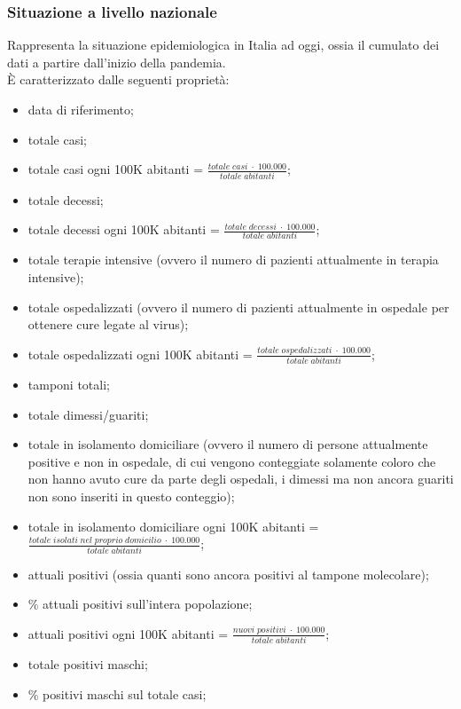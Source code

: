 \subsubsection{Situazione a livello nazionale}
\label{sss:situazione-livello-nazionale}
Rappresenta la situazione epidemiologica in Italia ad oggi, ossia il cumulato dei dati a partire dall'inizio della pandemia.\\
È caratterizzato dalle seguenti proprietà:
\begin{itemize}
    \item data di riferimento;
    \item totale casi;
    \item totale casi ogni 100K abitanti = $\frac{totale \; casi \; \cdot \; 100.000}{totale \; abitanti}$;
    \item totale decessi;
    \item totale decessi ogni 100K abitanti = $\frac{totale \; decessi \; \cdot \; 100.000}{totale \; abitanti}$;
    \item totale terapie intensive (ovvero il numero di pazienti attualmente in terapia intensive);
    \item totale ospedalizzati  (ovvero il numero di pazienti attualmente in ospedale per ottenere cure legate al virus);
    \item totale ospedalizzati ogni 100K abitanti = $\frac{totale \; ospedalizzati \; \cdot \; 100.000}{totale \; abitanti}$;
    \item tamponi totali;
    \item totale dimessi/guariti;
    \item totale in isolamento domiciliare (ovvero il numero di persone attualmente positive e non in ospedale, di cui vengono conteggiate solamente coloro che non hanno avuto cure da parte degli ospedali, i dimessi ma non ancora guariti non sono inseriti in questo conteggio);
    \item totale in isolamento domiciliare ogni 100K abitanti = $\frac{totale \; isolati \; nel \; proprio \; domicilio \; \cdot \; 100.000}{totale \; abitanti}$;
    \item attuali positivi (ossia quanti sono ancora positivi al tampone molecolare);
    \item \% attuali positivi sull'intera popolazione;
    \item attuali positivi ogni 100K abitanti = $\frac{nuovi \; positivi \; \cdot \; 100.000}{totale \; abitanti}$;
    \item totale positivi maschi;
    \item \% positivi maschi sul totale casi;

\end{itemize}

